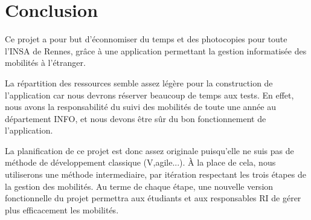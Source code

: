 \chapter*{Conclusion}

Ce projet a pour but d'éconnomiser du temps et des photocopies pour toute l'INSA de Rennes, grâce à une application permettant la gestion informatisée des mobilités à l'étranger.

\bigbreak

La répartition des ressources semble assez légère pour la construction de l'application car nous devrons réserver beaucoup de temps aux tests. En effet, nous avons la responsabilité du suivi des mobilités de toute une année au département INFO, et nous devons être sûr du bon fonctionnement de l'application.

\bigbreak

La planification de ce projet est donc assez originale puisqu'elle ne suis pas de méthode de développement classique (V,agile...). À la place de cela, nous utiliserons une méthode intermediaire, par itération respectant les trois étapes de la gestion des mobilités. Au terme de chaque étape, une nouvelle version fonctionnelle du projet permettra aux étudiants et aux responsables RI de gérer plus efficacement les mobilités. 
